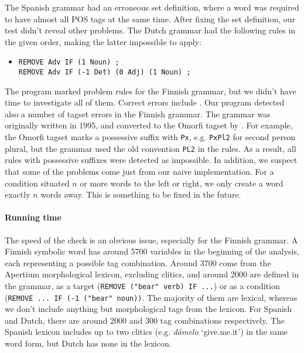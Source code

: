 The Spanish grammar had an erroneous set definition, where a word was required to have almost all POS tags at the same time. After fixing the set definition, our test didn't reveal other problems.
The Dutch grammar had the following rules in the given order, making the latter impossible to apply:
\begin{itemize}
\item[] 
\begin{verbatim}REMOVE Adv IF (1 Noun) ;
REMOVE Adv IF (-1 Det) (0 Adj) (1 Noun) ;
\end{verbatim}
\end{itemize}

The program marked  problem rules for the Finnish grammar, but we didn't have time to investigate all of them.
Correct errors include .
Our program detected also a number of tagset errors in the Finnish grammar.
The grammar was originally written in 1995, and converted to the Omorfi tagset by \cite{pirinen2015}. 
For example, the Omorfi tagset marks a possessive suffix with \texttt{Px}, e.g. \texttt{PxPl2} for second person plural, but the grammar used the old convention \texttt{PL2} in the rules.
As a result, all rules with possessive suffixes were detected as impossible.
In addition, we suspect that some of the problems come just from our naive implementation.
For a condition situated $n$ or more words to the left or right, we only create a word exactly $n$ words away. This is something to be fixed in the future.

\paragraph{Running time} The speed of the check is an obvious issue, especially for the Finnish grammar. 
A Finnish symbolic word has around 5700 variables in the beginning of the analysis, each representing a possible tag combination.
Around 3700 come from the Apertium morphological lexicon, excluding clitics, and around 2000 are defined in the grammar, as a target (\texttt{REMOVE ("bear" verb) IF ...}) or as a condition (\texttt{REMOVE ... IF (-1 ("bear" noun))}. The majority of them are lexical, whereas we don't include anything but morphological tags from the lexicon.
For Spanish and Dutch, there are around 2000 and 300 tag combinations respectively.
The Spanish lexicon includes up to two clitics (e.g. \emph{dámelo} `give.me.it') in the same word form, but Dutch has none in the lexicon.


